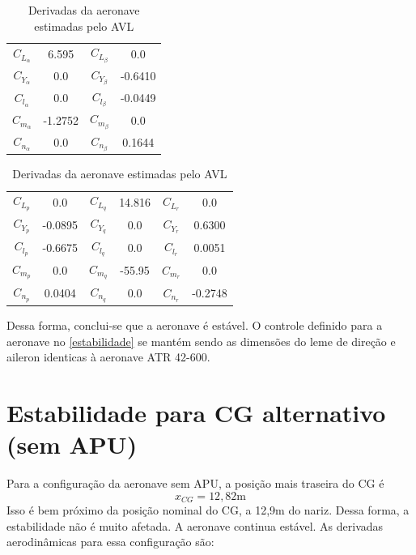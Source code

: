 \begin{table}[H]
\centering
\begin{tabular}{cccc}
\toprule
$ C_{L_{\alpha}} $ &   6.595 & $ C_{L_{\beta}} $ &     0.0  \\ [0.3cm]
$ C_{Y_{\alpha}} $ &     0.0 & $ C_{Y_{\beta}} $ & -0.6410  \\ [0.3cm]
$ C_{l_{\alpha}} $ &     0.0 & $ C_{l_{\beta}} $ & -0.0449  \\ [0.3cm]
$ C_{m_{\alpha}} $ & -1.2752 & $ C_{m_{\beta}} $ &     0.0  \\ [0.3cm]
$ C_{n_{\alpha}} $ &     0.0 & $ C_{n_{\beta}} $ &  0.1644  \\ [0.3cm]
\bottomrule
\end{tabular}
\begin{tabular}{cccccc}
\toprule
$ C_{L_{p}} $ &     0.0 & $ C_{L_{q}} $ & 14.816  & $ C_{L_{r}} $ &   0.0   \\ [0.3cm]
$ C_{Y_{p}} $ & -0.0895 & $ C_{Y_{q}} $ &    0.0  & $ C_{Y_{r}} $ & 0.6300  \\ [0.3cm]
$ C_{l_{p}} $ & -0.6675 & $ C_{l_{q}} $ &    0.0  & $ C_{l_{r}} $ & 0.0051 \\ [0.3cm]
$ C_{m_{p}} $ &     0.0 & $ C_{m_{q}} $ & -55.95  & $ C_{m_{r}} $ &   0.0  \\ [0.3cm]
$ C_{n_{p}} $ &  0.0404 & $ C_{n_{q}} $ &    0.0  & $ C_{n_{r}} $ & -0.2748 \\ [0.3cm]
\bottomrule
\end{tabular}
\caption[Derivadas da aeronave estimadas pelo AVL]{Derivadas da aeronave estimadas pelo AVL}
\label{tbl:derivadas_avl}
\end{table}

Dessa forma, conclui-se que a aeronave é estável. O controle definido para a aeronave no \autoref{estabilidade} se mantém sendo as dimensões do leme de direção e aileron identicas à aeronave ATR 42-600.

\section{Estabilidade para CG alternativo (sem APU)}

Para a configuração da aeronave sem APU, a posição mais traseira do CG é
\begin{equation}
  x_{CG} = 12,82\text{m}
\end{equation}
Isso é bem próximo da posição nominal do CG, a 12,9m do nariz.
 Dessa forma, a estabilidade não é muito afetada.
 A aeronave continua estável.
 As derivadas aerodinâmicas para essa configuração são:

